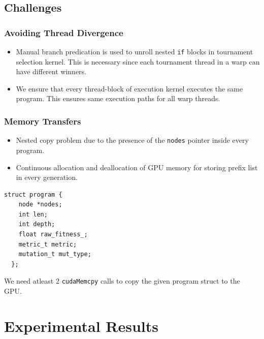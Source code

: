 \documentclass{beamer}
\begin{document}

\subsection{Challenges}
\begin{frame}
  \frametitle{Avoiding Thread Divergence}
  \begin{itemize}
    \item Manual branch predication is used to unroll nested \lstinline!if! blocks in tournament selection kernel. This is necessary since each tournament thread in a warp can have different winners.
    \item We ensure that every thread-block of execution kernel executes the same program. This ensures same execution paths for all warp threads. 
  \end{itemize}
\end{frame}

\begin{frame}[fragile]
  \centering
  \frametitle{Memory Transfers}
  \begin{itemize}
    \item Nested copy problem due to the presence of the \lstinline!nodes! pointer inside every program. 
    \item Continuous allocation and deallocation of GPU memory for storing prefix list in every generation.
  \end{itemize}
\begin{minipage}{0.5\textwidth}
  \centering
  \begin{lstlisting}[caption={Simplified code for program struct},label={lst:programstruct}]
  struct program {
    node *nodes;
    int len;
    int depth;
    float raw_fitness_;
    metric_t metric;
    mutation_t mut_type;
  }; 
\end{lstlisting}
\end{minipage}
\begin{minipage}{0.4\textwidth}
  We need atleast $2$ \lstinline!cudaMemcpy! calls to copy the given program struct to the GPU.
\end{minipage}
\end{frame}
\section{Experimental Results}
\end{document}
